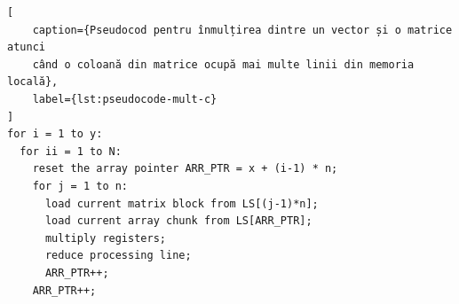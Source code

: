 \begin{lstlisting}[
    caption={Pseudocod pentru înmulțirea dintre un vector și o matrice atunci
    când o coloană din matrice ocupă mai multe linii din memoria locală},
    label={lst:pseudocode-mult-c}
]
for i = 1 to y:
  for ii = 1 to N:
    reset the array pointer ARR_PTR = x + (i-1) * n;
    for j = 1 to n:
      load current matrix block from LS[(j-1)*n];
      load current array chunk from LS[ARR_PTR];
      multiply registers;
      reduce processing line;
      ARR_PTR++;
    ARR_PTR++;
\end{lstlisting}

\begin{figure}[h]
\centering
\captionsetup{justification=centering}
\end{figure}
~
\begin{figure}[h]\ContinuedFloat
\centering
\captionsetup{justification=centering}
\end{figure}
